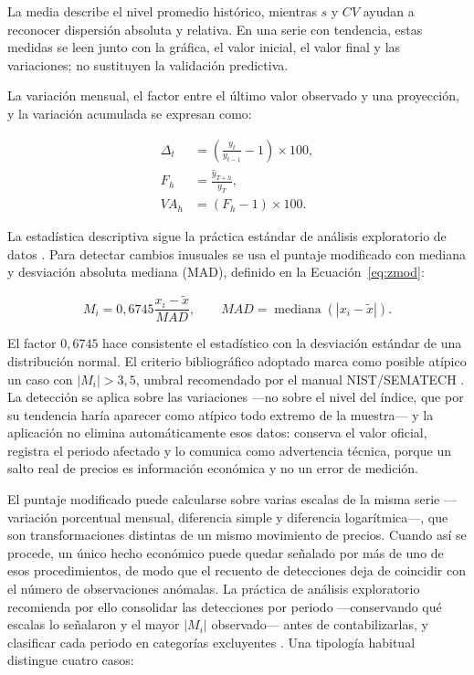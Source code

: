 \documentclass[12pt,letterpaper]{article}
\providecommand{\parencite}{\citep}
\begin{document}
La media describe el nivel promedio histórico, mientras \(s\) y \(CV\) ayudan a reconocer dispersión absoluta y relativa. En una serie con tendencia, estas medidas se leen junto con la gráfica, el valor inicial, el valor final y las variaciones; no sustituyen la validación predictiva.

La variación mensual, el factor entre el último valor observado y una proyección, y la variación acumulada se expresan como:

\begin{align}
\Delta_t &= \left(\frac{y_t}{y_{t-1}}-1\right)\times100, \\
F_h &= \frac{\hat{y}_{T+h}}{y_T}, \\
VA_h &= (F_h-1)\times100.
\end{align}

La estadística descriptiva sigue la práctica estándar de análisis exploratorio de datos \parencite{nist_eda_summary}. Para detectar cambios inusuales se usa el puntaje modificado con mediana y desviación absoluta mediana (MAD), definido en la Ecuación~\ref{eq:zmod}:

\begin{equation}
M_i=0,6745\frac{x_i-\widetilde{x}}{MAD},
\qquad MAD=\operatorname{mediana}(|x_i-\widetilde{x}|).
\label{eq:zmod}
\end{equation}

El factor $0{,}6745$ hace consistente el estadístico con la desviación estándar de una distribución normal. El criterio bibliográfico adoptado marca como posible atípico un caso con \(|M_i|>3,5\), umbral recomendado por el manual NIST/SEMATECH \parencite{nist_outliers}. La detección se aplica sobre las variaciones ---no sobre el nivel del índice, que por su tendencia haría aparecer como atípico todo extremo de la muestra--- y la aplicación no elimina automáticamente esos datos: conserva el valor oficial, registra el periodo afectado y lo comunica como advertencia técnica, porque un salto real de precios es información económica y no un error de medición.

El puntaje modificado puede calcularse sobre varias escalas de la misma serie ---variación porcentual mensual, diferencia simple y diferencia logarítmica---, que son transformaciones distintas de un mismo movimiento de precios. Cuando así se procede, un único hecho económico puede quedar señalado por más de uno de esos procedimientos, de modo que el recuento de detecciones deja de coincidir con el número de observaciones anómalas. La práctica de análisis exploratorio recomienda por ello consolidar las detecciones por periodo ---conservando qué escalas lo señalaron y el mayor $|M_i|$ observado--- antes de contabilizarlas, y clasificar cada periodo en categorías excluyentes \parencite{nist_outliers,nist_eda_summary}. Una tipología habitual distingue cuatro casos:
\end{document}
